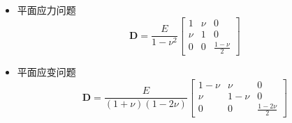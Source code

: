 \begin{itemize}
    \item 平面应力问题
\begin{equation}\label{Dplanestress}
\pmb D = \frac{E}{1-\nu^2}\left[\begin{matrix}1&\nu&0\\\nu&1&0\\0&0&\frac{1-\nu}{2}
\end{matrix}\right] 
\end{equation}
\item 平面应变问题
\begin{equation}
\pmb D = \frac{E}{(1+\nu)(1-2\nu)}\left[\begin{matrix}1-\nu&\nu&0\\\nu&1-\nu&0\\0&0&\frac{1-2\nu}{2}
\end{matrix}\right] 
\end{equation}
\end{itemize}
